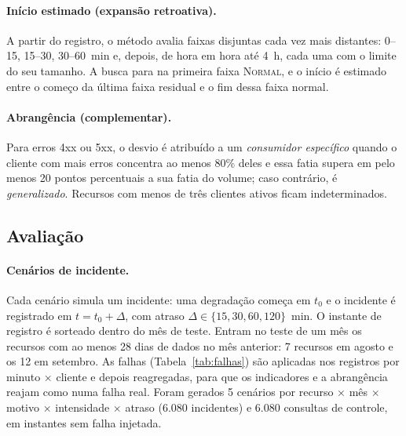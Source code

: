 \documentclass[sigconf,nonacm]{acmart}
\newcommand{\Normal}{\textsc{Normal}\xspace}
\begin{document}
\paragraph{Início estimado (expansão retroativa).} A partir do registro, o método avalia faixas disjuntas cada vez mais distantes: 0--15, 15--30, 30--60~min e, depois, de hora em hora até 4~h, cada uma com o limite do seu tamanho. A busca para na primeira faixa \Normal, e o início é estimado entre o começo da última faixa residual e o fim dessa faixa normal.

\paragraph{Abrangência (complementar).} Para erros 4xx ou 5xx, o desvio é atribuído a um \emph{consumidor específico} quando o cliente com mais erros concentra ao menos 80\% deles e essa fatia supera em pelo menos 20 pontos percentuais a sua fatia do volume; caso contrário, é \emph{generalizado}. Recursos com menos de três clientes ativos ficam indeterminados.

\subsection{Avaliação}

\paragraph{Cenários de incidente.} Cada cenário simula um incidente: uma degradação começa em $t_0$ e o incidente é registrado em $t=t_0+\Delta$, com atraso $\Delta\in\{15,30,60,120\}$~min. O instante de registro é sorteado dentro do mês de teste. Entram no teste de um mês os recursos com ao menos 28 dias de dados no mês anterior: 7 recursos em agosto e os 12 em setembro. As falhas (Tabela~\ref{tab:falhas}) são aplicadas nos registros por minuto $\times$ cliente e depois reagregadas, para que os indicadores e a abrangência reajam como numa falha real. Foram gerados 5 cenários por recurso $\times$ mês $\times$ motivo $\times$ intensidade $\times$ atraso (6.080 incidentes) e 6.080 consultas de controle, em instantes sem falha injetada. 
\end{document}
